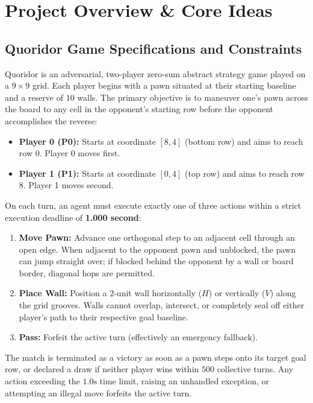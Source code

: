 \section{Project Overview \& Core Ideas}

\subsection{Quoridor Game Specifications and Constraints}
Quoridor is an adversarial, two-player zero-sum abstract strategy game played on a $9 \times 9$ grid. Each player begins with a pawn situated at their starting baseline and a reserve of $10$ walls. The primary objective is to maneuver one's pawn across the board to any cell in the opponent's starting row before the opponent accomplishes the reverse:
\begin{itemize}[leftmargin=1.5em]
    \item \textbf{Player 0 (P0):} Starts at coordinate $[8, 4]$ (bottom row) and aims to reach row $0$. Player 0 moves first.
    \item \textbf{Player 1 (P1):} Starts at coordinate $[0, 4]$ (top row) and aims to reach row $8$. Player 1 moves second.
\end{itemize}

On each turn, an agent must execute exactly one of three actions within a strict execution deadline of \textbf{1.000 second}:
\begin{enumerate}[leftmargin=1.5em]
    \item \textbf{Move Pawn:} Advance one orthogonal step to an adjacent cell through an open edge. When adjacent to the opponent pawn and unblocked, the pawn can jump straight over; if blocked behind the opponent by a wall or board border, diagonal hops are permitted.
    \item \textbf{Place Wall:} Position a $2$-unit wall horizontally ($H$) or vertically ($V$) along the grid grooves. Walls cannot overlap, intersect, or completely seal off either player's path to their respective goal baseline.
    \item \textbf{Pass:} Forfeit the active turn (effectively an emergency fallback).
\end{enumerate}

The match is terminated as a victory as soon as a pawn steps onto its target goal row, or declared a draw if neither player wins within $500$ collective turns. Any action exceeding the $1.0\text{s}$ time limit, raising an unhandled exception, or attempting an illegal move forfeits the active turn.

